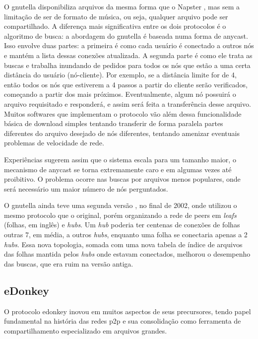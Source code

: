 O \gls*{gnutella} disponibiliza arquivos da mesma forma que o Napster
\cite{book:birman}, mas sem a limitação de ser de formato de música, ou seja, qualquer
arquivo pode ser compartilhado. A diferença mais significativa entre os dois protocolos
é o algoritmo de busca: a abordagem do \gls*{gnutella} é baseada numa forma de
\gls{anycast}. Isso envolve duas partes: a primeira é como cada usuário é conectado a
outros nós e mantém a lista dessas conexões atualizada. A segunda parte é como ele
trata as buscas e trabalha inundando de pedidos para todos os nós que estão a uma certa
distância do usuário (nó-cliente). Por exemplo, se a distância limite for de 4, então
todos os nós que estiverem a 4 passos a partir do cliente serão verificados, começando
a partir dos mais próximos. Eventualmente, algum nó possuirá o arquivo requisitado e
responderá, e assim será feita a transferência desse arquivo. Muitos softwares que
implementam o protocolo vão além dessa funcionalidade básica de download simples
tentando transferir de forma paralela partes diferentes do arquivo desejado de nós
diferentes, tentando amenizar eventuais problemas de velocidade de rede.

Experiências sugerem assim que o sistema escala para um tamanho maior, o mecanismo de
\gls*{anycast} se torna extremamente caro e em algumas vezes até proibitivo. O problema
ocorre nas buscas por arquivos menos populares, onde será necessário um maior número de
nós perguntados.

O \gls*{gnutella} ainda teve uma segunda versão \cite{wiki:gnutella2}, no final de 2002,
onde utilizou o mesmo protocolo que o original, porém organizando a rede de
\glspl*{peer} em \emph{leafs} (folhas, em inglês) e \emph{hubs}. Um \emph{hub} poderia
ter centenas de conexões de folhas outras 7, em média, a outros \emph{hubs}, enquanto
uma folha se conectaria apenas a 2 \emph{hubs}. Essa nova topologia, somada com uma
nova tabela de índice de arquivos das folhas mantida pelos \emph{hubs} onde estavam
conectados, melhorou o desempenho das buscas, que era ruim na versão antiga.

\subsection{eDonkey}

O protocolo \gls{edonkey} inovou em muitos aspectos de seus precursores, tendo papel
fundamental na história das redes \gls*{p2p} e sua consolidação como ferramenta de
compartilhamento especializado em arquivos grandes.

